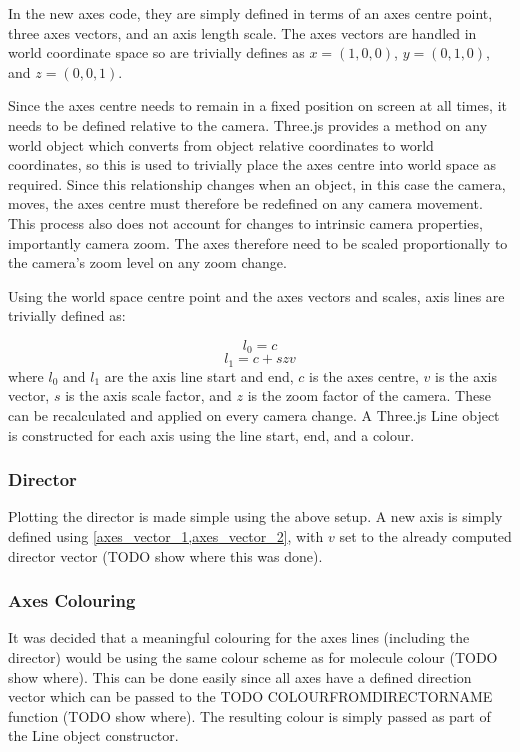 In the new axes code, they are simply defined in terms of an axes centre point, three axes vectors, and an axis length scale. The axes vectors are handled in world coordinate space so are trivially defines as $x=(1,0,0)$, $y=(0,1,0)$, and $z=(0,0,1)$.

Since the axes centre needs to remain in a fixed position on screen at all times, it needs to be defined relative to the camera. Three.js provides a method on any world object which converts from object relative coordinates to world coordinates, so this is used to trivially place the axes centre into world space as required. Since this relationship changes when an object, in this case the camera, moves, the axes centre must therefore be redefined on any camera movement. This process also does not account for changes to intrinsic camera properties, importantly camera zoom. The axes therefore need to be scaled proportionally to the camera's zoom level on any zoom change.

Using the world space centre point and the axes vectors and scales, axis lines are trivially defined as:

\begin{equation}
  l_0=c\label{axes_vector_1}
\end{equation}
\begin{equation}
  l_1=c+szv\label{axes_vector_2}
\end{equation}
where $l_0$ and $l_1$ are the axis line start and end, $c$ is the axes centre, $v$ is the axis vector, $s$ is the axis scale factor, and $z$ is the zoom factor of the camera. These can be recalculated and applied on every camera change. A Three.js Line object is constructed for each axis using the line start, end, and a colour.

\subsubsection{Director}
Plotting the director is made simple using the above setup. A new axis is simply defined using \cref{axes_vector_1,axes_vector_2}, with $v$ set to the already computed director vector (TODO show where this was done).

\subsubsection{Axes Colouring}
It was decided that a meaningful colouring for the axes lines (including the director) would be using the same colour scheme as for molecule colour (TODO show where). This can be done easily since all axes have a defined direction vector which can be passed to the TODO COLOURFROMDIRECTORNAME function (TODO show where). The resulting colour is simply passed as part of the Line object constructor.


